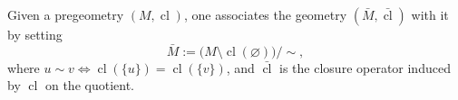 Given a pregeometry $(M, \operatorname{cl})$, one associates the geometry $(\bar{M}, \bar{\operatorname{cl}})$ with it by setting
$$\bar{M} := \bigl( M \setminus \operatorname{cl}(\varnothing) \bigr) / \sim,$$
where $u \sim v \iff \operatorname{cl}(\{u\}) = \operatorname{cl}(\{v\})$, and $\bar{\operatorname{cl}}$ is the closure operator induced by $\operatorname{cl}$ on the quotient.
